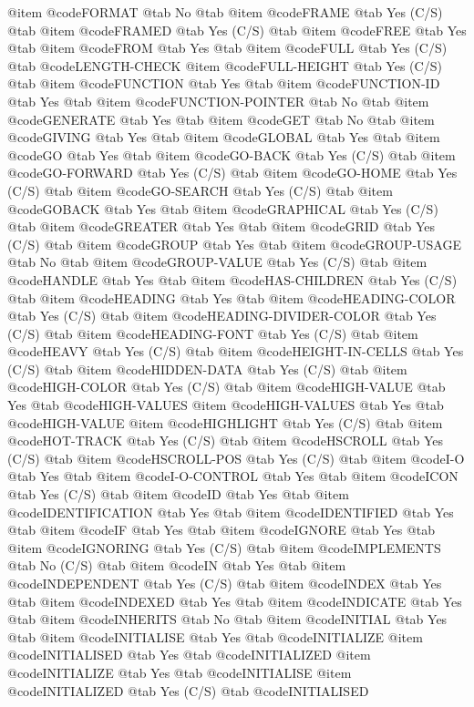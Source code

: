 @item @code{FORMAT} @tab No @tab 
@item @code{FRAME} @tab Yes	(C/S) @tab 
@item @code{FRAMED} @tab Yes	(C/S) @tab 
@item @code{FREE} @tab Yes @tab 
@item @code{FROM} @tab Yes @tab 
@item @code{FULL} @tab Yes	(C/S) @tab @code{LENGTH-CHECK}
@item @code{FULL-HEIGHT} @tab Yes	(C/S) @tab 
@item @code{FUNCTION} @tab Yes @tab 
@item @code{FUNCTION-ID} @tab Yes @tab 
@item @code{FUNCTION-POINTER} @tab No @tab 
@item @code{GENERATE} @tab Yes @tab 
@item @code{GET} @tab No @tab 
@item @code{GIVING} @tab Yes @tab 
@item @code{GLOBAL} @tab Yes @tab 
@item @code{GO} @tab Yes @tab 
@item @code{GO-BACK} @tab Yes	(C/S) @tab 
@item @code{GO-FORWARD} @tab Yes	(C/S) @tab 
@item @code{GO-HOME} @tab Yes	(C/S) @tab 
@item @code{GO-SEARCH} @tab Yes	(C/S) @tab 
@item @code{GOBACK} @tab Yes @tab 
@item @code{GRAPHICAL} @tab Yes	(C/S) @tab 
@item @code{GREATER} @tab Yes @tab 
@item @code{GRID} @tab Yes	(C/S) @tab 
@item @code{GROUP} @tab Yes @tab 
@item @code{GROUP-USAGE} @tab No @tab 
@item @code{GROUP-VALUE} @tab Yes	(C/S) @tab 
@item @code{HANDLE} @tab Yes @tab 
@item @code{HAS-CHILDREN} @tab Yes	(C/S) @tab 
@item @code{HEADING} @tab Yes @tab 
@item @code{HEADING-COLOR} @tab Yes	(C/S) @tab 
@item @code{HEADING-DIVIDER-COLOR} @tab Yes	(C/S) @tab 
@item @code{HEADING-FONT} @tab Yes	(C/S) @tab 
@item @code{HEAVY} @tab Yes	(C/S) @tab 
@item @code{HEIGHT-IN-CELLS} @tab Yes	(C/S) @tab 
@item @code{HIDDEN-DATA} @tab Yes	(C/S) @tab 
@item @code{HIGH-COLOR} @tab Yes	(C/S) @tab 
@item @code{HIGH-VALUE} @tab Yes @tab @code{HIGH-VALUES}
@item @code{HIGH-VALUES} @tab Yes @tab @code{HIGH-VALUE}
@item @code{HIGHLIGHT} @tab Yes	(C/S) @tab 
@item @code{HOT-TRACK} @tab Yes	(C/S) @tab 
@item @code{HSCROLL} @tab Yes	(C/S) @tab 
@item @code{HSCROLL-POS} @tab Yes	(C/S) @tab 
@item @code{I-O} @tab Yes @tab 
@item @code{I-O-CONTROL} @tab Yes @tab 
@item @code{ICON} @tab Yes	(C/S) @tab 
@item @code{ID} @tab Yes @tab 
@item @code{IDENTIFICATION} @tab Yes @tab 
@item @code{IDENTIFIED} @tab Yes @tab 
@item @code{IF} @tab Yes @tab 
@item @code{IGNORE} @tab Yes @tab 
@item @code{IGNORING} @tab Yes	(C/S) @tab 
@item @code{IMPLEMENTS} @tab No	(C/S) @tab 
@item @code{IN} @tab Yes @tab 
@item @code{INDEPENDENT} @tab Yes	(C/S) @tab 
@item @code{INDEX} @tab Yes @tab 
@item @code{INDEXED} @tab Yes @tab 
@item @code{INDICATE} @tab Yes @tab 
@item @code{INHERITS} @tab No @tab 
@item @code{INITIAL} @tab Yes @tab 
@item @code{INITIALISE} @tab Yes @tab @code{INITIALIZE}
@item @code{INITIALISED} @tab Yes @tab @code{INITIALIZED}
@item @code{INITIALIZE} @tab Yes @tab @code{INITIALISE}
@item @code{INITIALIZED} @tab Yes	(C/S) @tab @code{INITIALISED}
